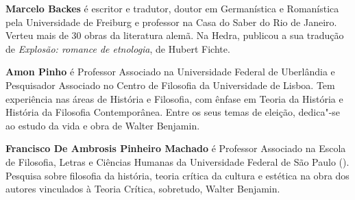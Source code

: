 \textbf{Marcelo Backes} é escritor e tradutor, doutor em Germanística e Romanística pela Universidade de Freiburg e professor na Casa do Saber do Rio de Janeiro. Verteu mais de 30 obras da literatura alemã. Na Hedra, publicou a sua tradução de \emph{Explosão: romance de etnologia}, de Hubert Fichte.

\textbf{Amon Pinho} é Professor Associado na Universidade Federal de Uberlândia e Pesquisador Associado no Centro de Filosofia da Universidade de Lisboa. Tem experiência nas áreas de História e Filosofia, com ênfase em Teoria da História e História da Filosofia Contemporânea. Entre os seus temas de eleição, dedica"-se ao estudo da vida e obra de Walter Benjamin.

\textbf{Francisco De Ambrosis Pinheiro Machado} é Professor Associado na Escola de Filosofia, Letras e Ciências Humanas da Universidade Federal de São Paulo (). Pesquisa sobre filosofia da história, teoria crítica da cultura e estética na obra dos autores vinculados à Teoria Crítica, sobretudo, Walter Benjamin.


